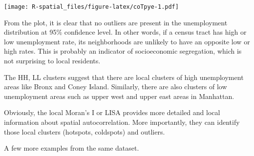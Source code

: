 \documentclass[
  11pt,
]{book}
\newenvironment{Shaded}{\begin{snugshade}}{\end{snugshade}}
\newcommand{\AttributeTok}[1]{\textcolor[rgb]{0.77,0.63,0.00}{#1}}
\newcommand{\CommentTok}[1]{\textcolor[rgb]{0.56,0.35,0.01}{\textit{#1}}}
\newcommand{\FunctionTok}[1]{\textcolor[rgb]{0.00,0.00,0.00}{#1}}
\newcommand{\NormalTok}[1]{#1}
\newcommand{\OtherTok}[1]{\textcolor[rgb]{0.56,0.35,0.01}{#1}}
\newcommand{\SpecialCharTok}[1]{\textcolor[rgb]{0.00,0.00,0.00}{#1}}
\newcommand{\StringTok}[1]{\textcolor[rgb]{0.31,0.60,0.02}{#1}}
\begin{document}
\begin{Shaded}
\end{Shaded}

\texttt{[image: R-spatial\_files/figure-latex/coTpye-1.pdf]}

From the plot, it is clear that no outliers are present in the unemployment distribution at 95\% confidence level. In other words, if a census tract has high or low unemployment rate, its neighborhoods are unlikely to have an opposite low or high rates. This is probably an indicator of socioeconomic segregation, which is not surprising to local residents.

The HH, LL clusters suggest that there are local clusters of high unemployment areas like Bronx and Coney Island. Similarly, there are also clusters of low unemployment areas such as upper west and upper east areas in Manhattan.

Obviously, the local Moran's I or LISA provides more detailed and local information about spatial autocorrelation. More importantly, they can identify those local clusters (hotspots, coldspots) and outliers.

A few more examples from the same dataset.
\end{document}
